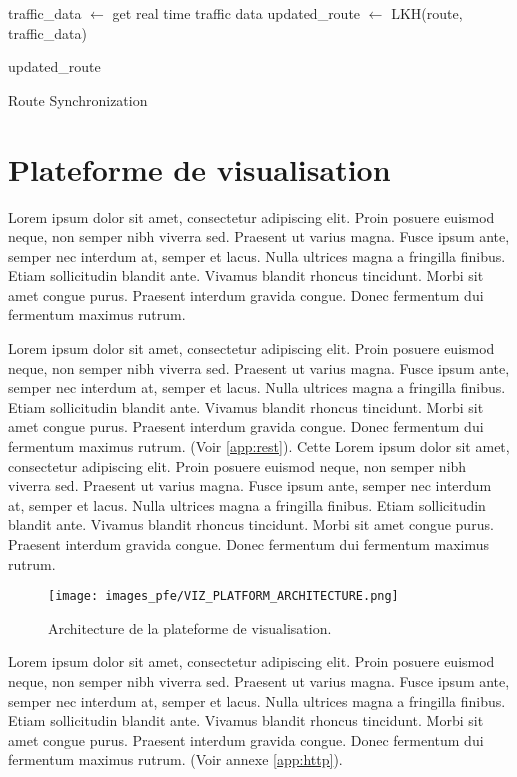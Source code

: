 \medskip

\begin{algorithm}[H]
  traffic\_data $\gets$ get real time traffic data \;
  updated\_route $\gets$ LKH(route, traffic\_data) \;
  
  \Return updated\_route \;
  \caption{Route Synchronization}
  \label{alg:sync}
\end{algorithm}
\FloatBarrier

\medskip


\section{Plateforme de visualisation}
Lorem ipsum dolor sit amet, consectetur adipiscing elit. Proin posuere euismod neque, non semper nibh viverra sed. Praesent ut varius magna. Fusce ipsum ante, semper nec interdum at, semper et lacus. Nulla ultrices magna a fringilla finibus. Etiam sollicitudin blandit ante. Vivamus blandit rhoncus tincidunt. Morbi sit amet congue purus. Praesent interdum gravida congue. Donec fermentum dui fermentum maximus rutrum.

\medskip

Lorem ipsum dolor sit amet, consectetur adipiscing elit. Proin posuere euismod neque, non semper nibh viverra sed. Praesent ut varius magna. Fusce ipsum ante, semper nec interdum at, semper et lacus. Nulla ultrices magna a fringilla finibus. Etiam sollicitudin blandit ante. Vivamus blandit rhoncus tincidunt. Morbi sit amet congue purus. Praesent interdum gravida congue. Donec fermentum dui fermentum maximus rutrum. (Voir \ref{app:rest}). Cette Lorem ipsum dolor sit amet, consectetur adipiscing elit. Proin posuere euismod neque, non semper nibh viverra sed. Praesent ut varius magna. Fusce ipsum ante, semper nec interdum at, semper et lacus. Nulla ultrices magna a fringilla finibus. Etiam sollicitudin blandit ante. Vivamus blandit rhoncus tincidunt. Morbi sit amet congue purus. Praesent interdum gravida congue. Donec fermentum dui fermentum maximus rutrum.

\medskip


\begin{figure}[hbt!]
  \centering
  \texttt{[image: images\_pfe/VIZ\_PLATFORM\_ARCHITECTURE.png]}
  \caption{Architecture de la plateforme de visualisation.}
  \label{fig:viz-platform-architecture}
\end{figure}
\FloatBarrier

Lorem ipsum dolor sit amet, consectetur adipiscing elit. Proin posuere euismod neque, non semper nibh viverra sed. Praesent ut varius magna. Fusce ipsum ante, semper nec interdum at, semper et lacus. Nulla ultrices magna a fringilla finibus. Etiam sollicitudin blandit ante. Vivamus blandit rhoncus tincidunt. Morbi sit amet congue purus. Praesent interdum gravida congue. Donec fermentum dui fermentum maximus rutrum. (Voir annexe \ref{app:http}).

